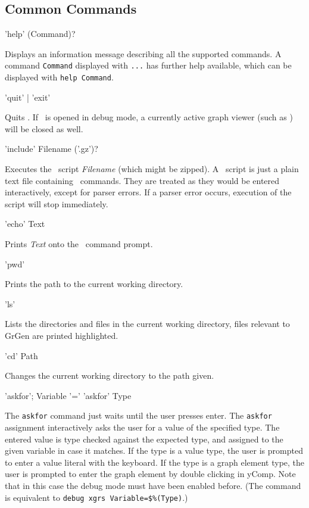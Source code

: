 \subsection{Common Commands}
\label{commcommands}
\begin{rail}
  'help' (Command)?
\end{rail}
Displays an information message describing all the supported commands. 
A command \texttt{Command} displayed with \texttt{...} has further help available, which can be displayed with \texttt{help Command}.

\begin{rail}
  'quit' | 'exit'
\end{rail}
Quits \GrShell. If \GrShell\ is opened in debug mode, a currently active graph viewer (such as \yComp) will be closed as well.

\begin{rail}
  'include' Filename ('.gz')?
\end{rail}
Executes the \GrShell\ script \emph{Filename} (which might be zipped).
A \GrShell\ script is just a plain text file containing \GrShell\ commands.
They are treated as they would be entered interactively, except for parser errors.
If a parser error occurs, execution of the script will stop immediately.

\begin{rail}
  'echo' Text
\end{rail}
Prints \emph{Text} onto the \GrShell\ command prompt.

\begin{rail}
  'pwd'
\end{rail}
Prints the path to the current working directory.

\begin{rail}
  'ls'
\end{rail}
Lists the directories and files in the current working directory, files relevant to GrGen are printed highlighted.

\begin{rail}
  'cd' Path
\end{rail}
Changes the current working directory to the path given.

\begin{rail}
  'askfor';
  Variable '=' 'askfor' Type
\end{rail}
The \texttt{askfor} command just waits until the user presses enter.
The \texttt{askfor} assignment interactively asks the user for a value of the specified type.
The entered value is type checked against the expected type, and assigned to the given variable in case it matches.
If the type is a value type, the user is prompted to enter a value literal with the keyboard.
If the type is a graph element type, the user is prompted to enter the graph element by double clicking in yComp.
Note that in this case the debug mode must have been enabled before.
(The command is equivalent to \verb#debug xgrs Variable=$%(Type)#.)

